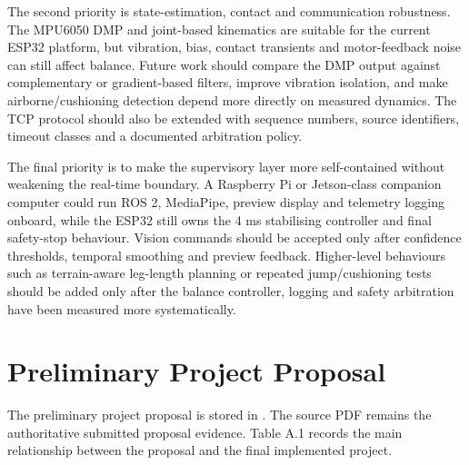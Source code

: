 \documentclass[12pt, a4paper]{article}
\begin{document}
The second priority is state-estimation, contact and communication robustness. The MPU6050 DMP and joint-based kinematics are suitable for the current ESP32 platform, but vibration, bias, contact transients and motor-feedback noise can still affect balance. Future work should compare the DMP output against complementary or gradient-based filters, improve vibration isolation, and make airborne/cushioning detection depend more directly on measured dynamics. The TCP protocol should also be extended with sequence numbers, source identifiers, timeout classes and a documented arbitration policy.

The final priority is to make the supervisory layer more self-contained without weakening the real-time boundary. A Raspberry Pi or Jetson-class companion computer could run ROS 2, MediaPipe, preview display and telemetry logging onboard, while the ESP32 still owns the 4 ms stabilising controller and final safety-stop behaviour. Vision commands should be accepted only after confidence thresholds, temporal smoothing and preview feedback. Higher-level behaviours such as terrain-aware leg-length planning or repeated jump/cushioning tests should be added only after the balance controller, logging and safety arbitration have been measured more systematically.


\newpage
\printbibliography

\newpage
\appendix
\section{Preliminary Project Proposal}
The preliminary project proposal is stored in . The source PDF remains the authoritative submitted proposal evidence. Table A.1 records the main relationship between the proposal and the final implemented project.
\end{document}
